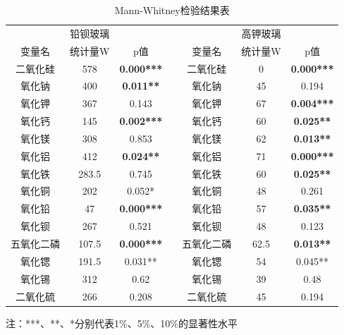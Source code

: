 \documentclass[withoutpreface,bwprint]{cumcmthesis} %
\begin{document}
\begin{table}[H]
  \centering
  \caption{Mann-Whitney检验结果表}
  \begin{threeparttable} 
  \begin{tabular}{ccccccc}
    \toprule[1.5pt]
    & 铅钡玻璃  &                   &           &       & 高钾玻璃          &                   \\ \cline{1-3} \cline{5-7} 
    变量名   & 统计量W  & p值                &           & 变量名   & 统计量W          & p值                \\ \hline
    二氧化硅  & 578   & \textbf{0.000***} & \textbf{} & 二氧化硅  & 0    & \textbf{0.000***} \\
    氧化钠   & 400   & \textbf{0.011**}  & \textbf{} & 氧化钠   & 45            & 0.194             \\
    氧化钾   & 367   & 0.143             &           & 氧化钾   & 67   & \textbf{0.004***} \\
    氧化钙   & 145   & \textbf{0.002***} & \textbf{} & 氧化钙   & 60   & \textbf{0.025**}  \\
    氧化镁   & 308   & 0.853             &           & 氧化镁   & 62   & \textbf{0.013**}  \\
    氧化铝   & 412   & \textbf{0.024**}  & \textbf{} & 氧化铝   & 71   & \textbf{0.000***} \\
    氧化铁   & 283.5 & 0.745             &           & 氧化铁   & 60   & \textbf{0.025**}  \\
    氧化铜   & 202   & 0.052*            &           & 氧化铜   & 48            & 0.261             \\
    氧化铅   & 47    & \textbf{0.000***} & \textbf{} & 氧化铅   & 57   & \textbf{0.035**}  \\
    氧化钡   & 267   & 0.521             &           & 氧化钡   & 48            & 0.123             \\
    五氧化二磷 & 107.5 & \textbf{0.000***} & \textbf{} & 五氧化二磷 & 62.5 & \textbf{0.013**}  \\
    氧化锶   & 191.5 & 0.031**           &           & 氧化锶   & 54            & 0.045**           \\
    氧化锡   & 312   & 0.62              &           & 氧化锡   & 39            & 0.48              \\
    二氧化硫  & 266   & 0.208             &           & 二氧化硫  & 45            & 0.194             \\ \bottomrule[1.5pt]
  \end{tabular}
\begin{tablenotes}
  \footnotesize
  \item 注：***、**、*分别代表1$\%$、5$\%$、10$\%$的显著性水平
\end{tablenotes}
\end{threeparttable}
\end{table}
\end{document}
